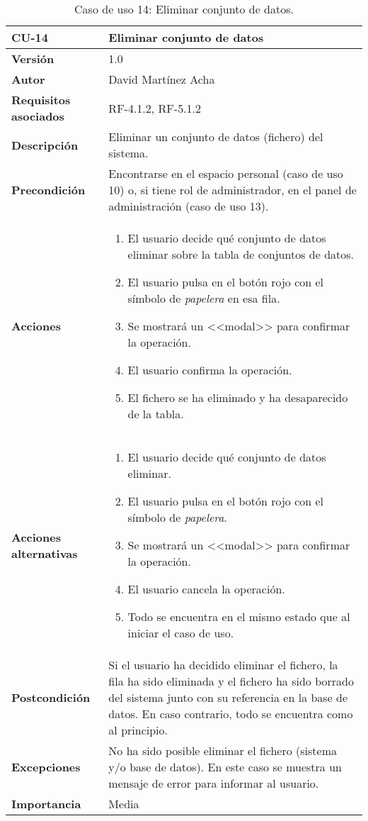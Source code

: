 \begin{table}[p]
	\centering
	\begin{tabularx}{\linewidth}{ p{} p{} }
		\toprule
		\textbf{CU-14}    & \textbf{Eliminar conjunto de datos}\\
		\toprule
		\textbf{Versión}              & 1.0    \\
		\textbf{Autor}                & David Martínez Acha \\
		\textbf{Requisitos asociados} & RF-4.1.2, RF-5.1.2 \\
		\textbf{Descripción}          & Eliminar un conjunto de datos (fichero) del sistema. \\
		\textbf{Precondición}         & Encontrarse en el espacio personal (caso de uso 10) o, si tiene rol de administrador, en el panel de administración (caso de uso 13). \\
		\textbf{Acciones}             &
		\begin{enumerate}
			\def\labelenumi{\arabic{enumi}.}
			\tightlist
			\item El usuario decide qué conjunto de datos eliminar sobre la tabla de conjuntos de datos.
			\item El usuario pulsa en el botón rojo con el símbolo de \textit{papelera}  en esa fila.
			\item Se mostrará un <<modal>> para confirmar la operación.
			\item El usuario confirma la operación.
			\item El fichero se ha eliminado y ha desaparecido de la tabla.
		\end{enumerate}\\
		\textbf{Acciones alternativas}&
		\begin{enumerate}
			\def\labelenumi{\arabic{enumi}.}
			\tightlist
			\item El usuario decide qué conjunto de datos eliminar.
			\item El usuario pulsa en el botón rojo con el símbolo de \textit{papelera}.
			\item Se mostrará un <<modal>> para confirmar la operación.
			\item El usuario cancela la operación.
			\item Todo se encuentra en el mismo estado que al iniciar el caso de uso.
		\end{enumerate}\\
		\textbf{Postcondición}        & Si el usuario ha decidido eliminar el fichero, la fila ha sido eliminada y el fichero ha sido borrado del sistema junto con su referencia en la base de datos. 
		En caso contrario, todo se encuentra como al principio.\\
		\textbf{Excepciones}          & No ha sido posible eliminar el fichero (sistema y/o base de datos). En este caso se muestra un mensaje de error para informar al usuario. \\
		\textbf{Importancia}          & Media \\
		\bottomrule
	\end{tabularx}
	\caption{Caso de uso 14: Eliminar conjunto de datos.}
\end{table}

